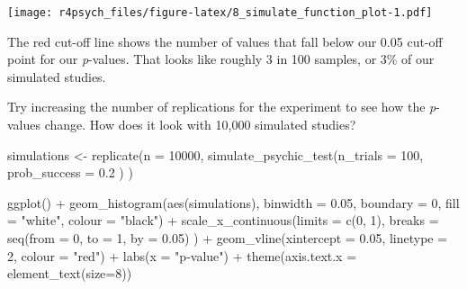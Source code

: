\documentclass[
]{book}
\newenvironment{Shaded}{\begin{snugshade}}{\end{snugshade}}
\newcommand{\AttributeTok}[1]{\textcolor[rgb]{0.77,0.63,0.00}{#1}}
\newcommand{\DecValTok}[1]{\textcolor[rgb]{0.00,0.00,0.81}{#1}}
\newcommand{\FloatTok}[1]{\textcolor[rgb]{0.00,0.00,0.81}{#1}}
\newcommand{\FunctionTok}[1]{\textcolor[rgb]{0.00,0.00,0.00}{#1}}
\newcommand{\NormalTok}[1]{#1}
\newcommand{\OtherTok}[1]{\textcolor[rgb]{0.56,0.35,0.01}{#1}}
\newcommand{\SpecialCharTok}[1]{\textcolor[rgb]{0.00,0.00,0.00}{#1}}
\newcommand{\StringTok}[1]{\textcolor[rgb]{0.31,0.60,0.02}{#1}}
\begin{document}
\texttt{[image: r4psych\_files/figure-latex/8\_simulate\_function\_plot-1.pdf]}

The red cut-off line shows the number of values that fall below our 0.05 cut-off point for our \emph{p}-values. That looks like roughly 3 in 100 samples, or 3\% of our simulated studies.

Try increasing the number of replications for the experiment to see how the \emph{p}-values change. How does it look with 10,000 simulated studies?

\begin{Shaded}
\begin{Highlighting}[]
\NormalTok{simulations }\OtherTok{\textless{}{-}} \FunctionTok{replicate}\NormalTok{(}\AttributeTok{n =} \DecValTok{10000}\NormalTok{, }
                         \FunctionTok{simulate\_psychic\_test}\NormalTok{(}\AttributeTok{n\_trials =} \DecValTok{100}\NormalTok{, }
                                               \AttributeTok{prob\_success =} \FloatTok{0.2}
\NormalTok{                                               )}
\NormalTok{                         )}
\end{Highlighting}
\end{Shaded}

\begin{Shaded}
\begin{Highlighting}[]
\FunctionTok{ggplot}\NormalTok{() }\SpecialCharTok{+} 
  \FunctionTok{geom\_histogram}\NormalTok{(}\FunctionTok{aes}\NormalTok{(simulations),}
                 \AttributeTok{binwidth =} \FloatTok{0.05}\NormalTok{,}
                 \AttributeTok{boundary =} \DecValTok{0}\NormalTok{,}
                 \AttributeTok{fill =} \StringTok{"white"}\NormalTok{,}
                 \AttributeTok{colour =} \StringTok{"black"}\NormalTok{) }\SpecialCharTok{+}
  \FunctionTok{scale\_x\_continuous}\NormalTok{(}\AttributeTok{limits =} \FunctionTok{c}\NormalTok{(}\DecValTok{0}\NormalTok{, }\DecValTok{1}\NormalTok{), }
                     \AttributeTok{breaks =} \FunctionTok{seq}\NormalTok{(}\AttributeTok{from =} \DecValTok{0}\NormalTok{, }\AttributeTok{to =} \DecValTok{1}\NormalTok{, }\AttributeTok{by =} \FloatTok{0.05}\NormalTok{)}
\NormalTok{                     ) }\SpecialCharTok{+}
  \FunctionTok{geom\_vline}\NormalTok{(}\AttributeTok{xintercept =} \FloatTok{0.05}\NormalTok{, }\AttributeTok{linetype =} \DecValTok{2}\NormalTok{, }\AttributeTok{colour =} \StringTok{"red"}\NormalTok{) }\SpecialCharTok{+}
  \FunctionTok{labs}\NormalTok{(}\AttributeTok{x =} \StringTok{"p{-}value"}\NormalTok{) }\SpecialCharTok{+}
  \FunctionTok{theme}\NormalTok{(}\AttributeTok{axis.text.x =} \FunctionTok{element\_text}\NormalTok{(}\AttributeTok{size=}\DecValTok{8}\NormalTok{))}
\end{Highlighting}
\end{Shaded}
\end{document}

